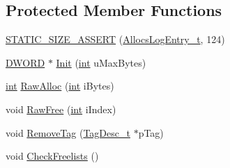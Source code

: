 \subsection*{Protected Member Functions}
\begin{DoxyCompactItemize}
\item 
\hyperlink{classCSphArena_a081bfb5d166b63eb5054895497a299c4}{S\-T\-A\-T\-I\-C\-\_\-\-S\-I\-Z\-E\-\_\-\-A\-S\-S\-E\-R\-T} (\hyperlink{structCSphArena_1_1AllocsLogEntry__t}{Allocs\-Log\-Entry\-\_\-t}, 124)
\item 
\hyperlink{sphinxstd_8h_a798af1e30bc65f319c1a246cecf59e39}{D\-W\-O\-R\-D} $\ast$ \hyperlink{classCSphArena_acd61de3bbe7162a4c1d0b2269a1d62c1}{Init} (\hyperlink{sphinxexpr_8cpp_a4a26e8f9cb8b736e0c4cbf4d16de985e}{int} u\-Max\-Bytes)
\item 
\hyperlink{sphinxexpr_8cpp_a4a26e8f9cb8b736e0c4cbf4d16de985e}{int} \hyperlink{classCSphArena_a6e9272e4d88f1d9450d2439ba8af86dc}{Raw\-Alloc} (\hyperlink{sphinxexpr_8cpp_a4a26e8f9cb8b736e0c4cbf4d16de985e}{int} i\-Bytes)
\item 
void \hyperlink{classCSphArena_ab14c0eca8431084af5f6090711695461}{Raw\-Free} (\hyperlink{sphinxexpr_8cpp_a4a26e8f9cb8b736e0c4cbf4d16de985e}{int} i\-Index)
\item 
void \hyperlink{classCSphArena_a1711c5d6a1a58f11be395f9e6ecd8d40}{Remove\-Tag} (\hyperlink{structCSphArena_1_1TagDesc__t}{Tag\-Desc\-\_\-t} $\ast$p\-Tag)
\item 
void \hyperlink{classCSphArena_a3cae1279e5972f74458f5ac69b12b79e}{Check\-Freelists} ()
\end{DoxyCompactItemize}
